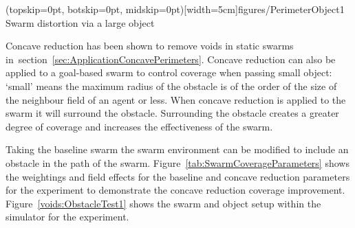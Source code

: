 \documentclass{ieeeaccess}
\begin{document}

\Figure[t!](topskip=0pt, botskip=0pt, midskip=0pt)[width=5cm]{figures/PerimeterObject1}
{Swarm distortion via a large object\label{concave:PerimeterObject1}}

 
Concave reduction has been shown to remove voids in static swarms in~section~\ref{sec:ApplicationConcavePerimeters}. Concave reduction can also be applied to a goal-based swarm to control coverage when passing small object: `small' means the maximum radius of the obstacle is of the order of the size of the neighbour field of an agent or less. When concave reduction is applied to the swarm it will surround the obstacle. Surrounding the obstacle creates a greater degree of coverage and increases the effectiveness of the swarm.

Taking the baseline swarm the swarm environment can be modified to include an obstacle in the path of the swarm. Figure~\ref{tab:SwarmCoverageParameters} shows the weightings and field effects for the baseline and concave reduction parameters for the experiment to demonstrate the concave reduction coverage improvement. Figure~\ref{voids:ObstacleTest1} shows the swarm and object setup within the simulator for the experiment.
\end{document}
